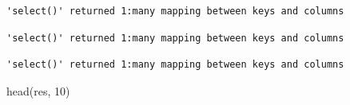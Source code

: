 \documentclass[
  letterpaper,
  DIV=11,
  numbers=noendperiod]{scrartcl}
\newenvironment{Shaded}{\begin{snugshade}}{\end{snugshade}}
\newcommand{\AttributeTok}[1]{\textcolor[rgb]{0.40,0.45,0.13}{#1}}
\newcommand{\DecValTok}[1]{\textcolor[rgb]{0.68,0.00,0.00}{#1}}
\newcommand{\FunctionTok}[1]{\textcolor[rgb]{0.28,0.35,0.67}{#1}}
\newcommand{\NormalTok}[1]{\textcolor[rgb]{0.00,0.23,0.31}{#1}}
\newcommand{\OtherTok}[1]{\textcolor[rgb]{0.00,0.23,0.31}{#1}}
\newcommand{\SpecialCharTok}[1]{\textcolor[rgb]{0.37,0.37,0.37}{#1}}
\newcommand{\StringTok}[1]{\textcolor[rgb]{0.13,0.47,0.30}{#1}}
\begin{document}
\begin{verbatim}
'select()' returned 1:many mapping between keys and columns
\end{verbatim}

\begin{Shaded}
\end{Shaded}

\begin{verbatim}
'select()' returned 1:many mapping between keys and columns
\end{verbatim}

\begin{Shaded}
\end{Shaded}

\begin{verbatim}
'select()' returned 1:many mapping between keys and columns
\end{verbatim}

\begin{Shaded}
\begin{Highlighting}[]
\FunctionTok{head}\NormalTok{(res, }\DecValTok{10}\NormalTok{)}
\end{Highlighting}
\end{Shaded}
\end{document}
